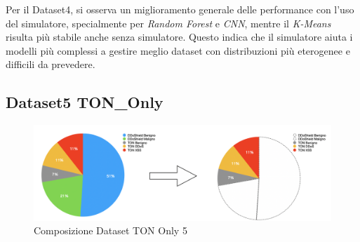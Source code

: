 \begin{table}[htbp]
\centering
\renewcommand{\arraystretch}{1.5}
\caption{Metriche di performance per Dataset4 TON\_Only}
\label{tab:performance_metrics}
\end{table}

Per il Dataset4, si osserva un miglioramento generale delle performance con l'uso del simulatore, specialmente per \textit{Random Forest} e \textit{CNN}, mentre il \textit{K-Means} risulta più stabile anche senza simulatore. Questo indica che il simulatore aiuta i modelli più complessi a gestire meglio dataset con distribuzioni più eterogenee e difficili da prevedere.

\subsection{Dataset5 TON\_Only}

\begin{figure}[htbp]
\centering
\includegraphics[scale= 0.6]{UNINA_MSc_Thesis_Project/img/chapterRisulati/TON_Only/composizione_TON_ONLY5.png}
  \caption{Composizione Dataset TON Only 5}
\end{figure}

